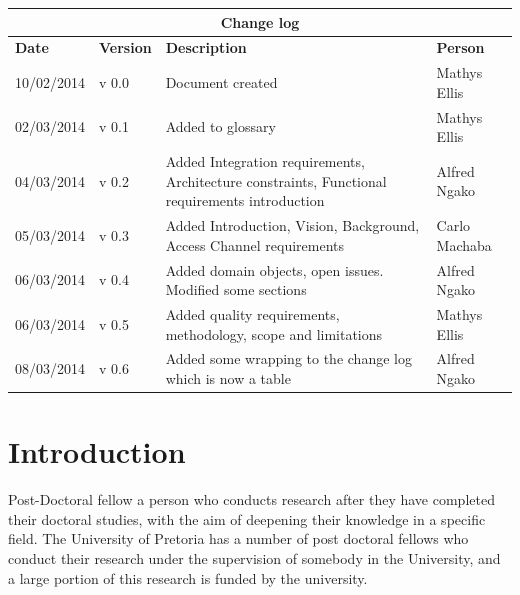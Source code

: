 \documentclass[12pt]{article}
\begin{document}
	\begin{center}
		\begin{tabular}{|l|p{1.4cm}|p{8cm}|p{2.8cm}|}
			\hline
			\multicolumn{4}{|c|}{\bf Change log} \\
			\hline
			\bf Date & \bf Version & \bf Description & \bf Person \\
			\hline
			10/02/2014 & v 0.0 & Document created & Mathys Ellis \\
			\hline
			02/03/2014 & v 0.1 & Added to glossary & Mathys Ellis \\
			\hline
			04/03/2014 & v 0.2 & Added Integration requirements, Architecture constraints, Functional requirements introduction   & Alfred Ngako \\
			\hline
			05/03/2014 & v 0.3 & Added Introduction, Vision, Background, Access Channel requirements & Carlo Machaba \\
			\hline
			06/03/2014 & v 0.4 & Added domain objects, open issues. Modified some sections  & Alfred Ngako \\
			\hline
			06/03/2014 & v 0.5 & Added quality requirements, methodology, scope and limitations  & Mathys Ellis \\
			\hline
			08/03/2014 & v 0.6 & Added some wrapping to the change log which is now a table  & Alfred Ngako \\
			\hline
			
		\end{tabular}
	\end{center}
	\newpage
		\tableofcontents
			
		\listoffigures
	\newpage
	\section{Introduction} %
	Post-Doctoral fellow a person who conducts research after they have completed their doctoral studies, with the aim of deepening their knowledge in a specific field. The University of Pretoria has a number of post doctoral fellows who conduct their research under the supervision of somebody in the University, and a large portion of this research is funded by the university. 
	\vspace{0.2in}
\end{document}

